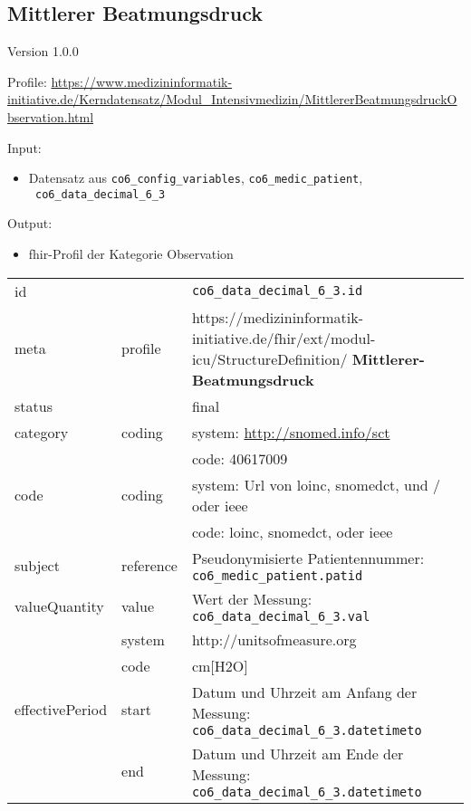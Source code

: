 \subsection{Mittlerer Beatmungsdruck} 
\noindent Version 1.0.0

\noindent Profile: \url{https://www.medizininformatik-initiative.de/Kerndatensatz/Modul_Intensivmedizin/MittlererBeatmungsdruckObservation.html}

\noindent Input:
\begin{itemize}
	\item Datensatz aus \texttt{co6\_config\_variables}, \texttt{co6\_medic\_patient}, \\ \texttt{
co6\_data\_decimal\_6\_3}
\end{itemize}
Output:
\begin{itemize}
        \item \ac{fhir}-Profil der Kategorie \glqq Observation\grqq{}
\end{itemize}
\begin{longtable}{|l|l|p{7.5cm}|}
        \hline
        \rowcolor{lightgray} \multicolumn{3}{|l|}{Data Mapping (inhaltlich)} \\ \hline
        id &  & \texttt{co6\_data\_decimal\_6\_3.id} \\ \hline
	meta & profile & https://medizininformatik-initiative.de/fhir/ext/modul-icu/StructureDefinition/\textbf{
Mittlerer-Beatmungsdruck} \\ \hline 
	status &  & final  \\ \hline 
	category & coding & system: \url{http://snomed.info/sct} \\
\cline{3-3}
	& & code: 40617009 \\ \hline
	code & coding & system: Url von \ac{loinc}, \ac{snomedct}, und / oder \ac{ieee} \\ 
	\cline{3-3} 
	 &  & code: \ac{loinc}, \ac{snomedct}, oder \ac{ieee} \\ \hline
	subject & reference & Pseudonymisierte Patientennummer: \texttt{co6\_medic\_patient.patid} \\ \hline
	valueQuantity & value & Wert der Messung: \texttt{co6\_data\_decimal\_6\_3.val} \\
        \cline{2-3}
         & system & http://unitsofmeasure.org \\
         \cline{2-3}
         & code & cm[H2O] \\ \hline
    effectivePeriod & start & Datum und Uhrzeit am Anfang der Messung: \texttt{
co6\_data\_decimal\_6\_3.datetimeto} \\
    \cline{2-3}
     & end & Datum und Uhrzeit am Ende der Messung: \texttt{
co6\_data\_decimal\_6\_3.datetimeto} \\ \hline
\end{longtable}


